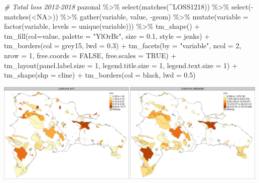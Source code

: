 \documentclass[10pt,landscape,a3paper]{article}
\newenvironment{Shaded}{\begin{snugshade}}{\end{snugshade}}
\newcommand{\AttributeTok}[1]{\textcolor[rgb]{0.77,0.63,0.00}{#1}}
\newcommand{\CommentTok}[1]{\textcolor[rgb]{0.56,0.35,0.01}{\textit{#1}}}
\newcommand{\ConstantTok}[1]{\textcolor[rgb]{0.00,0.00,0.00}{#1}}
\newcommand{\DecValTok}[1]{\textcolor[rgb]{0.00,0.00,0.81}{#1}}
\newcommand{\FloatTok}[1]{\textcolor[rgb]{0.00,0.00,0.81}{#1}}
\newcommand{\FunctionTok}[1]{\textcolor[rgb]{0.00,0.00,0.00}{#1}}
\newcommand{\NormalTok}[1]{#1}
\newcommand{\SpecialCharTok}[1]{\textcolor[rgb]{0.00,0.00,0.00}{#1}}
\newcommand{\StringTok}[1]{\textcolor[rgb]{0.31,0.60,0.02}{#1}}
\begin{document}
\begin{Shaded}
\begin{Highlighting}[]

\CommentTok{\# Total loss 2012{-}2018}
\NormalTok{pazonal }\SpecialCharTok{\%\textgreater{}\%} \FunctionTok{select}\NormalTok{(}\FunctionTok{matches}\NormalTok{(}\StringTok{\textquotesingle{}\^{}LOSS1218\textquotesingle{}}\NormalTok{)) }\SpecialCharTok{\%\textgreater{}\%} \FunctionTok{select}\NormalTok{(}\SpecialCharTok{{-}}\FunctionTok{matches}\NormalTok{(}\StringTok{\textquotesingle{}\textless{}NA\textgreater{}\textquotesingle{}}\NormalTok{)) }\SpecialCharTok{\%\textgreater{}\%} 
  \FunctionTok{gather}\NormalTok{(variable, value, }\SpecialCharTok{{-}}\NormalTok{geom) }\SpecialCharTok{\%\textgreater{}\%}
  \FunctionTok{mutate}\NormalTok{(}\AttributeTok{variable =} \FunctionTok{factor}\NormalTok{(variable, }\AttributeTok{levels =} \FunctionTok{unique}\NormalTok{(variable))) }\SpecialCharTok{\%\textgreater{}\%} 
  \FunctionTok{tm\_shape}\NormalTok{() }\SpecialCharTok{+}
  \FunctionTok{tm\_fill}\NormalTok{(}\AttributeTok{col=}\StringTok{\textquotesingle{}value\textquotesingle{}}\NormalTok{, }\AttributeTok{palette =} \StringTok{"YlOrBr"}\NormalTok{, }\AttributeTok{size =} \FloatTok{0.1}\NormalTok{, }\AttributeTok{style =} \StringTok{\textquotesingle{}jenks\textquotesingle{}}\NormalTok{) }\SpecialCharTok{+}
  \FunctionTok{tm\_borders}\NormalTok{(}\AttributeTok{col =} \StringTok{\textquotesingle{}grey15\textquotesingle{}}\NormalTok{, }\AttributeTok{lwd =} \FloatTok{0.3}\NormalTok{) }\SpecialCharTok{+}
  \FunctionTok{tm\_facets}\NormalTok{(}\AttributeTok{by =} \StringTok{"variable"}\NormalTok{, }\AttributeTok{ncol =} \DecValTok{2}\NormalTok{, }\AttributeTok{nrow =} \DecValTok{1}\NormalTok{, }\AttributeTok{free.coords =} \ConstantTok{FALSE}\NormalTok{, }\AttributeTok{free.scales =} \ConstantTok{TRUE}\NormalTok{) }\SpecialCharTok{+}
  \FunctionTok{tm\_layout}\NormalTok{(}\AttributeTok{panel.label.size =} \DecValTok{1}\NormalTok{, }\AttributeTok{legend.title.size =} \DecValTok{1}\NormalTok{, }\AttributeTok{legend.text.size =} \DecValTok{1}\NormalTok{) }\SpecialCharTok{+} 
  \FunctionTok{tm\_shape}\NormalTok{(}\AttributeTok{shp =}\NormalTok{ cline) }\SpecialCharTok{+} \FunctionTok{tm\_borders}\NormalTok{(}\AttributeTok{col =} \StringTok{\textquotesingle{}black\textquotesingle{}}\NormalTok{, }\AttributeTok{lwd =} \FloatTok{0.5}\NormalTok{)}
\end{Highlighting}
\end{Shaded}

\begin{center}\includegraphics{img/zonal-pa-7} \end{center}
\end{document}
